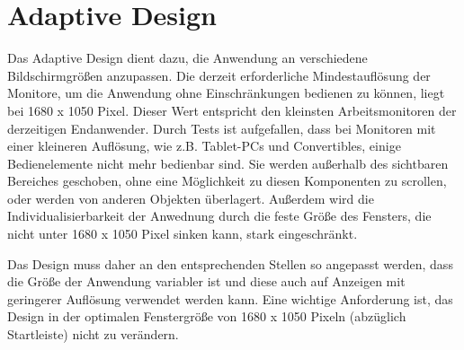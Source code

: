 \chapter{Adaptive Design}
Das Adaptive Design dient dazu, die Anwendung an verschiedene Bildschirmgrößen anzupassen. Die derzeit erforderliche Mindestauflösung der Monitore, um die Anwendung ohne Einschränkungen bedienen zu können, liegt bei 1680 x 1050 Pixel. Dieser Wert entspricht den kleinsten Arbeitsmonitoren der derzeitigen Endanwender. Durch Tests ist aufgefallen, dass bei Monitoren mit einer kleineren Auflösung, wie z.B. Tablet-PCs und Convertibles, einige Bedienelemente nicht mehr bedienbar sind. Sie werden außerhalb des sichtbaren Bereiches geschoben, ohne eine Möglichkeit zu diesen Komponenten zu scrollen, oder werden von anderen Objekten überlagert. Außerdem wird die Individualisierbarkeit der Anwednung durch die feste Größe des Fensters, die nicht unter 1680 x 1050 Pixel sinken kann, stark eingeschränkt.\par
Das Design muss daher an den entsprechenden Stellen so angepasst werden, dass die Größe der Anwendung variabler ist und diese auch auf Anzeigen mit geringerer Auflösung verwendet werden kann. Eine wichtige Anforderung ist, das Design in der optimalen Fenstergröße von 1680 x 1050 Pixeln (abzüglich Startleiste) nicht zu verändern.\par
